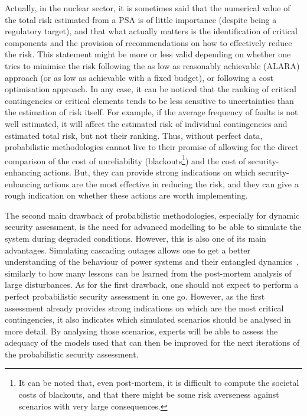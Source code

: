 Actually, in the nuclear sector, it is sometimes said that the numerical value of the total risk estimated from a PSA is of little importance (despite being a regulatory target), and that what actually matters is the identification of critical components and the provision of recommendations on how to effectively reduce the risk. This statement might be more or less valid depending on whether one tries to minimise the risk following the as low as reasonably achievable (ALARA) approach (or as low as achievable with a fixed budget), or following a cost optimisation approach. In any case, it can be noticed that the ranking of critical contingencies or critical elements tends to be less sensitive to uncertainties than the estimation of risk itself. For example, if the average frequency of faults is not well estimated, it will affect the estimated risk of individual contingencies and estimated total risk, but not their ranking. Thus, without perfect data, probabilistic methodologies cannot live to their promise of allowing for the direct comparison of the cost of unreliability (blackouts\footnote{It can be noted that, even post-mortem, it is difficult to compute the societal costs of blackouts, and that there might be some risk averseness against scenarios with very large consequences.}) and the cost of security-enhancing actions. But, they can provide strong indications on which security-enhancing actions are the most effective in reducing the risk, and they can give a rough indication on whether these actions are worth implementing.

The second main drawback of probabilistic methodologies, especially for dynamic security assessment, is the need for advanced modelling to be able to simulate the system during degraded conditions. However, this is also one of its main advantages. Simulating cascading outages allows one to get a better understanding of the behaviour of power systems and their entangled dynamics~\cite{PEGASE_simulation}, similarly to how many lessons can be learned from the post-mortem analysis of large disturbances. As for the first drawback, one should not expect to perform a perfect probabilistic security assessment in one go. However, as the first assessment already provides strong indications on which are the most critical contingencies, it also indicates which simulated scenarios should be analysed in more detail. By analysing those scenarios, experts will be able to assess the adequacy of the models used that can then be improved for the next iterations of the probabilistic security assessment.

